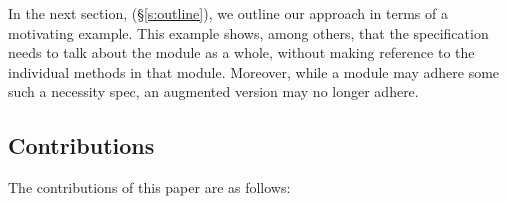  
% 
% 
%
% 
% 

In the next section, (\S\ref{s:outline}),  we outline our approach in terms of a motivating example.
This example shows, among others, that the specification needs to talk about the module as a whole,
without making reference to the individual methods in that module.
Moreover, while a module may adhere some such a necessity spec, an
augmented version may no longer adhere. 
 

\subsection{Contributions}

The contributions of this paper are as follows:
 
